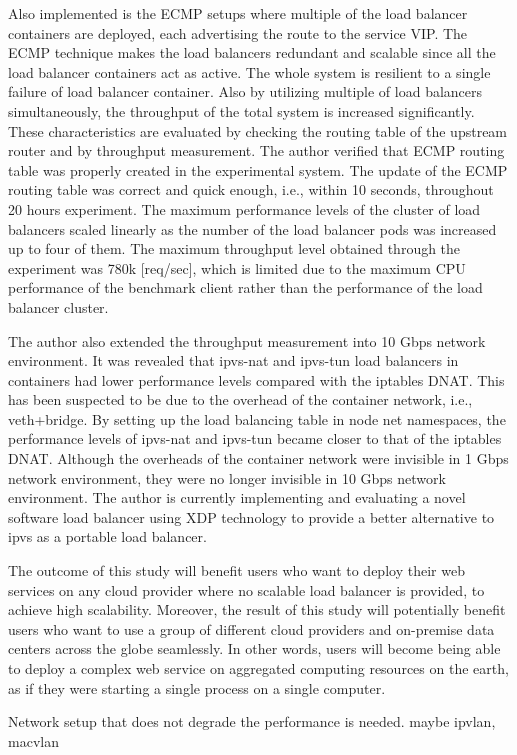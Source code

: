 Also implemented is the ECMP setups where multiple of the load balancer containers are deployed, each advertising the route to the service VIP.
The ECMP technique makes the load balancers redundant and scalable since all the load balancer containers act as active.
The whole system is resilient to a single failure of load balancer container.
Also by utilizing multiple of load balancers simultaneously, the throughput of the total system is increased significantly.
These characteristics are evaluated by checking the routing table of the upstream router and by throughput measurement.
%
The author verified that ECMP routing table was properly created in the experimental system.
The update of the ECMP routing table was correct and quick enough, i.e., within 10 seconds, throughout 20 hours experiment.
The maximum performance levels of the cluster of load balancers scaled linearly as the number of the load balancer pods was increased up to four of them.
The maximum throughput level obtained through the experiment was 780k [req/sec], which is limited due to the maximum CPU performance of the benchmark client rather than the performance of the load balancer cluster.

The author also extended the throughput measurement into 10 Gbps network environment.
It was revealed that ipvs-nat and ipvs-tun load balancers in containers had lower performance levels compared with the iptables DNAT.
This has been suspected to be due to the overhead of the container network, i.e., veth+bridge.
By setting up the load balancing table in node net namespaces, the performance levels of ipvs-nat and ipvs-tun became closer to that of the iptables DNAT.
Although the overheads of the container network were invisible in 1 Gbps network environment, they were no longer invisible in 10 Gbps network environment.
The author is currently implementing and evaluating a novel software load balancer using XDP technology to provide a better alternative to ipvs as a portable load balancer.

The outcome of this study will benefit users who want to deploy their web services on any cloud provider where no scalable load balancer is provided, to achieve high scalability.
Moreover, the result of this study will potentially benefit users who want to use a group of different cloud providers and on-premise data centers across the globe seamlessly.
In other words, users will become being able to deploy a complex web service on aggregated computing resources on the earth, as if they were starting a single process on a single computer.




Network setup that does not degrade the performance is needed.
maybe ipvlan, macvlan
 
